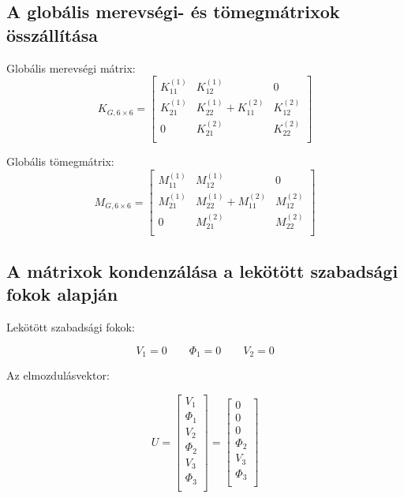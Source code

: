 \documentclass{article}
\begin{document}
	
	
	\subsection{A globális merevségi- és tömegmátrixok összállítása}
		
		Globális merevségi mátrix:
		\begin{equation}
			K_{G,6\times6}=
			\begin{bmatrix}
			K_{11}^{(1)} & K_{12}^{(1)}              & 0            \\
			K_{21}^{(1)} & K_{22}^{(1)}+K_{11}^{(2)} & K_{12}^{(2)} \\
			0            & K_{21}^{(2)}              & K_{22}^{(2)} \\
			\end{bmatrix}
		\end{equation}
		
		Globális tömegmátrix:
		\begin{equation}
			M_{G,6\times6}=
			\begin{bmatrix}
			M_{11}^{(1)} & M_{12}^{(1)}              & 0            \\
			M_{21}^{(1)} & M_{22}^{(1)}+M_{11}^{(2)} & M_{12}^{(2)} \\
			0            & M_{21}^{(2)}              & M_{22}^{(2)} \\
			\end{bmatrix}
		\end{equation}
	 
	
	\subsection{A mátrixok kondenzálása a lekötött szabadsági fokok alapján}
	
		Lekötött szabadsági fokok:
		
		\[V_{1}=0 \qquad \Phi_{1}=0 \qquad V_{2}=0\]	
	
		Az elmozdulásvektor:
		
		\begin{equation}
			U=
			\begin{bmatrix}
			V_{1}    \\
			\Phi_{1} \\
			V_{2}    \\
			\Phi_{2} \\
			V_{3}    \\
			\Phi_{3} \\
			\end{bmatrix}
			=
			\begin{bmatrix}
			0  \\
			0 \\
			0    \\
			\Phi_{2} \\
			V_{3}    \\
			\Phi_{3} \\
			\end{bmatrix}
		\end{equation}
		
\end{document}
